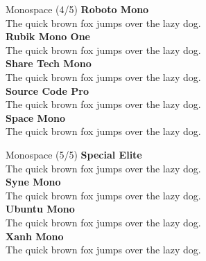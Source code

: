 \documentclass[10pt]{beamer}
\begin{document}
\begin{frame}{Monospace (4/5)}
\vspace{-0.2cm}
  {\RobotoMonoLocal\Large\bfseries Roboto Mono\\}
  {\RobotoMonoLocal The quick brown fox jumps over the lazy dog.\\[0.3cm]}
  {\RubikMonoOneLocal\Large\bfseries Rubik Mono One\\}
  {\RubikMonoOneLocal The quick brown fox jumps over the lazy dog.\\[0.3cm]}
  {\ShareTechMonoLocal\Large\bfseries Share Tech Mono\\}
  {\ShareTechMonoLocal The quick brown fox jumps over the lazy dog.\\[0.3cm]}
  {\SourceCodeProLocal\Large\bfseries Source Code Pro\\}
  {\SourceCodeProLocal The quick brown fox jumps over the lazy dog.\\[0.3cm]}
  {\SpaceMonoLocal\Large\bfseries Space Mono\\}
  {\SpaceMonoLocal The quick brown fox jumps over the lazy dog.\\[0.3cm]}
\end{frame}

\begin{frame}{Monospace (5/5)}
\vspace{-0.2cm}
  {\SpecialEliteLocal\Large\bfseries Special Elite\\}
  {\SpecialEliteLocal The quick brown fox jumps over the lazy dog.\\[0.3cm]}
  {\SyneMonoLocal\Large\bfseries Syne Mono\\}
  {\SyneMonoLocal The quick brown fox jumps over the lazy dog.\\[0.3cm]}
  {\UbuntuMonoLocal\Large\bfseries Ubuntu Mono\\}
  {\UbuntuMonoLocal The quick brown fox jumps over the lazy dog.\\[0.3cm]}
  {\XanhMonoLocal\Large\bfseries Xanh Mono\\}
  {\XanhMonoLocal The quick brown fox jumps over the lazy dog.\\[0.3cm]}
\end{frame}
\end{document}
